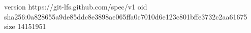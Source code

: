 version https://git-lfs.github.com/spec/v1
oid sha256:0a828655a9de85ddc8e3898ae065ffa0c7010d6e123c801bffe3732c2aa61675
size 14151951
